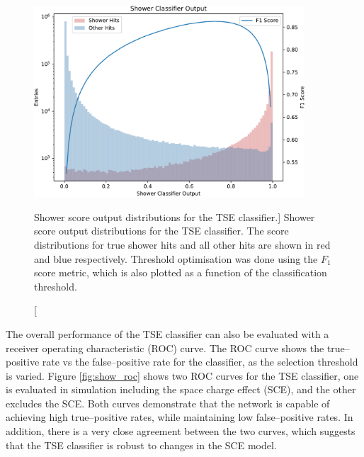 \begin{figure}
	\centering
	\includegraphics[width=0.9\textwidth]{figures/shower_combined.pdf} 
	\caption
	[Shower score output distributions for the TSE classifier.]
	{Shower score output distributions for the TSE classifier. The score
	distributions for true shower hits and all other hits are shown in red and
	blue respectively. Threshold optimisation was done using the $F_1$ score 
	metric, which is also plotted as a function of the classification threshold.}
	\label{fig:show_output}
\end{figure}

\noindent
The overall performance of the TSE classifier can also be evaluated with a
receiver operating characteristic (ROC) curve\cite{Fawcett2006}. The ROC curve
shows the true--positive rate vs the false--positive rate for the classifier, as
the selection threshold is varied. Figure \ref{fig:show_roc} shows two ROC
curves for the TSE classifier, one is evaluated in simulation including
the space charge effect (SCE), and the other excludes the SCE. Both curves
demonstrate that the network is capable of achieving high true--positive rates,
while maintaining low false--positive rates. In addition, there is a very close
agreement between the two curves, which suggests that the TSE classifier is
robust to changes in the SCE model.

